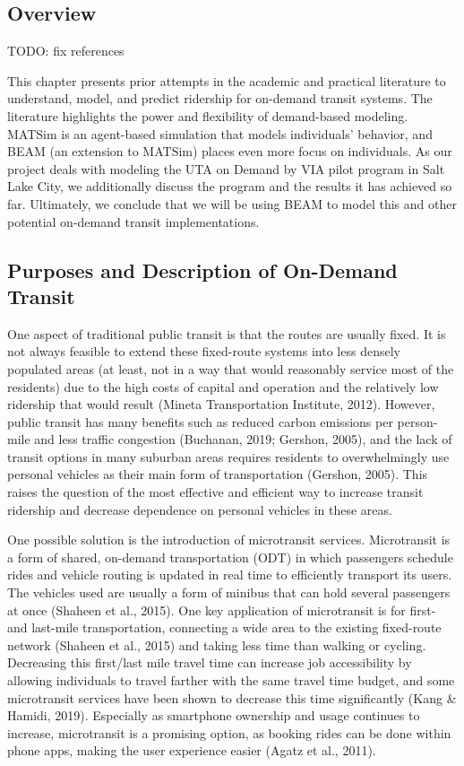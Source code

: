 \documentclass[
]{article}
\begin{document}
\hypertarget{overview}{%
\subsection{Overview}\label{overview}}

TODO: fix references

This chapter presents prior attempts in the academic and practical literature to understand, model, and predict ridership for on-demand transit systems. The literature highlights the power and flexibility of demand-based modeling. MATSim is an agent-based simulation that models individuals' behavior, and BEAM (an extension to MATSim) places even more focus on individuals. As our project deals with modeling the UTA on Demand by VIA pilot program in Salt Lake City, we additionally discuss the program and the results it has achieved so far. Ultimately, we conclude that we will be using BEAM to model this and other potential on-demand transit implementations.

\hypertarget{purposes-and-description-of-on-demand-transit}{%
\subsection{Purposes and Description of On-Demand Transit}\label{purposes-and-description-of-on-demand-transit}}

One aspect of traditional public transit is that the routes are usually fixed. It is not always feasible to extend these fixed-route systems into less densely populated areas (at least, not in a way that would reasonably service most of the residents) due to the high costs of capital and operation and the relatively low ridership that would result (Mineta Transportation Institute, 2012). However, public transit has many benefits such as reduced carbon emissions per person-mile and less traffic congestion (Buchanan, 2019; Gershon, 2005), and the lack of transit options in many suburban areas requires residents to overwhelmingly use personal vehicles as their main form of transportation (Gershon, 2005). This raises the question of the most effective and efficient way to increase transit ridership and decrease dependence on personal vehicles in these areas.

One possible solution is the introduction of microtransit services. Microtransit is a form of shared, on-demand transportation (ODT) in which passengers schedule rides and vehicle routing is updated in real time to efficiently transport its users. The vehicles used are usually a form of minibus that can hold several passengers at once (Shaheen et al., 2015). One key application of microtransit is for first- and last-mile transportation, connecting a wide area to the existing fixed-route network (Shaheen et al., 2015) and taking less time than walking or cycling. Decreasing this first/last mile travel time can increase job accessibility by allowing individuals to travel farther with the same travel time budget, and some microtransit services have been shown to decrease this time significantly (Kang \& Hamidi, 2019). Especially as smartphone ownership and usage continues to increase, microtransit is a promising option, as booking rides can be done within phone apps, making the user experience easier (Agatz et al., 2011).
\end{document}
